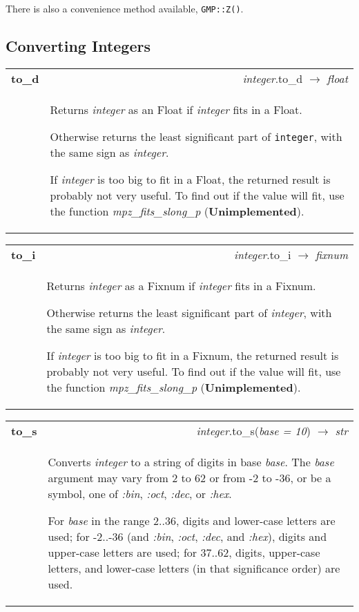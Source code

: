 \documentclass[pdftex,10pt]{article}
\newlength{\methwidth}
\newlength{\defnwidth}
\begin{document}
There is also a convenience method available, \texttt{GMP::Z()}.\\

\subsection{Converting Integers}

\begin{tabular}{p{\methwidth} l r}
\toprule
\textbf{to\_d} & & \textit{integer}.to\_d $\rightarrow$ \textit{float} \\
\cmidrule(r){2-3}
& \multicolumn{2}{p{\defnwidth}}{
  Returns \textit{integer} as an Float if \textit{integer} fits in a Float.

  Otherwise returns the least significant part of \texttt{integer}, with the same sign as
  \textit{integer}.
  
  If \textit{integer} is too big to fit in a Float, the returned result is probably not
  very useful. To find out if the value will fit, use the function
  \textit{mpz\_fits\_slong\_p} (\textbf{Unimplemented}).
}
\end{tabular}
\newline\newline

\begin{tabular}{p{\methwidth} l r}
\toprule
\textbf{to\_i} & & \textit{integer}.to\_i $\rightarrow$ \textit{fixnum} \\
\cmidrule(r){2-3}
& \multicolumn{2}{p{\defnwidth}}{
  Returns \textit{integer} as a Fixnum if \textit{integer} fits in a Fixnum.
  \newline
  
  Otherwise returns the least significant part of \textit{integer}, with the same sign as
  \textit{integer}.
  \newline
  
  If \textit{integer} is too big to fit in a Fixnum, the returned result is probably not
  very useful. To find out if the value will fit, use the function
  \textit{mpz\_fits\_slong\_p} (\textbf{Unimplemented}).
}
\end{tabular}
\newline\newline

\begin{tabular}{p{\methwidth} l r}
\toprule
\textbf{to\_s} & & \textit{integer}.to\_s(\textit{base = 10}) $\rightarrow$ \textit{str} \\
\cmidrule(r){2-3}
& \multicolumn{2}{p{\defnwidth}}{
  Converts \textit{integer} to a string of digits in base \textit{base}. The
  \textit{base} argument may vary from 2 to 62 or from -2 to -36, or be a symbol, one of
  \textit{:bin}, \textit{:oct}, \textit{:dec}, or \textit{:hex}.
  \newline
  
  For \textit{base} in the range 2..36, digits and lower-case letters are used; for
  -2..-36 (and \textit{:bin}, \textit{:oct}, \textit{:dec}, and \textit{:hex}), digits
  and upper-case letters are used; for 37..62, digits, upper-case letters, and lower-case
  letters (in that significance order) are used.
}
\end{tabular}
\end{document}
